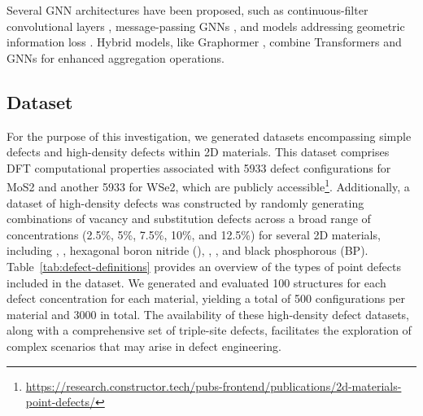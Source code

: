     Several GNN architectures have been proposed, such as continuous-filter convolutional layers \cite{schutt2018schnet}, message-passing GNNs \cite{chen2019graph}, and models addressing geometric information loss \cite{klicpera2020directional, GemNet}. Hybrid models, like Graphormer \cite{ying2021transformers, shi2022benchmarking}, combine Transformers and GNNs for enhanced aggregation operations.



\subsection{Dataset}
    \label{sec:dataset}

    For the purpose of this investigation, we generated datasets encompassing simple defects and high-density defects within 2D materials. This dataset comprises DFT computational properties associated with 5933 defect configurations for MoS2 and another 5933 for WSe2, which are publicly accessible\footnote{\url{https://research.constructor.tech/pubs-frontend/publications/2d-materials-point-defects/}}\cite{defectsdataset}. Additionally, a dataset of high-density defects was constructed by randomly generating combinations of vacancy and substitution defects across a broad range of concentrations (2.5\%, 5\%, 7.5\%, 10\%, and 12.5\%) for several 2D materials, including , , hexagonal boron nitride (), , , and black phosphorous (BP). Table~\ref{tab:defect-definitions} provides an overview of the types of point defects included in the dataset. We generated and evaluated 100 structures for each defect concentration for each material, yielding a total of 500 configurations per material and 3000 in total. The availability of these high-density defect datasets, along with a comprehensive set of triple-site defects, facilitates the exploration of complex scenarios that may arise in defect engineering.
    
